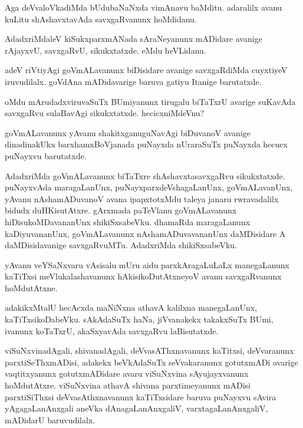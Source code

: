 \documentclass{article}
\begin{document}
\begin{mng}%
Aga deVvaloVkadiMda bUdubaNaNxda vimAnavu baMditu. adaralilx avanu 
kuLitu shAshavxtavAda savxgaRvanunx hoMdidanu.
\end{mng}

\begin{mng}%
AdadxriMdaleV kiSukxparxmANada sAraNeyanunx mADidare avanige rAjayxvU, 
savxgaRvU, sikukxtatxde. eMdu heVLidanu.
\end{mng}

\begin{mng}%
adeV riVtiyAgi goVmALavanunx biDisidare avanige savxgaRdiMda cuyxtiyeV 
iruvudilalx. goVdAna mADidavarige baruva gatiyu Itanige barutatxde.
\end{mng}

\begin{mng}%
oMdu mArudadxviruvaSuTx BUmiyanunx tirugalu biTaTxrU avarige suKavAda 
savxgaRvu sulaBavAgi sikukxtatxde. hecicxniMdeVnu?
\end{mng}

\begin{mng}%
goVmALavanunx yAvanu shakitxganuguNavAgi biDuvanoV avanige 
dinadinakUkx barxhamxBoVjanada puNayxda nUraraSuTx puNayxda hecucx 
puNayxvu barutatxde.
\end{mng}

\begin{mng}%
AdadxriMda goVmALavanunx biTaTxre shAshavxtasavxgaRvu sikukxtatxde. 
puNayxvAda maragaLanUnx, puNayxparxdeVshagaLanUnx, goVmALavanUnx, 
yAvanu nAshamADuvanoV avana ipapxtotxMdu taleya janaru rwravadalilx 
bidudx duHKisutAtxre. gArxmada paTeVlanu goVmALavanunx 
hiDisukoMDavananUnx shikiSxsabeVku. dhamaRda maragaLanunx 
kaDiyuvananUnx, goVmALavanunx nAshamADuvavananUnx daMDisidare A 
daMDisidavanige savxgaRvuMTu. AdadxriMda shikiSxsabeVku.
\end{mng}

\begin{mng}%
yAvanu veYSaNxvaru vAsisalu mUru aidu parxkAragaLuLaLx manegaLanunx 
kaTiTxsi meVlukalashavanunx hAkisikoDutAtxneyoV avanu savxgaRvanunx 
hoMdutAtxne.
\end{mng}

\begin{mng}%
adakikxMtalU hecAcxda maNiNxna athavA kalilxna manegaLanUnx, 
kaTiTxsikoDabeVku. sAkAdaSuTx haNa, jiVvanakekx takakxSuTx BUmi, 
ivanunx koTaTxrU, akaSxyavAda savxgaRvu laBisutatxde.
\end{mng}

\begin{mng}%
viSuNxvinadAgali, shivanadAgali, deVvasAThxnavanunx kaTitxsi, 
deVvaranunx parxtiSeThxmADisi, adakekx beVkAdaSuTx seVvakaranunx 
gotutxmADi avarige vaqtitxyanunx gotutxmADidare avaru viSuNxvina 
sAyujayxvanunx hoMdutAtxre. viSuNxvina athavA shivana parxtimeyanunx 
mADisi parxtiSiThxsi deVvasAthxnavanunx kaTiTxsidare baruva puNayxvu 
sAvira yAgagaLanAnxgali aneVka dAnagaLanAnxgaliV, varxtagaLanAnxgaliV, 
mADidarU baruvudilalx.
\end{mng}
\end{document}
